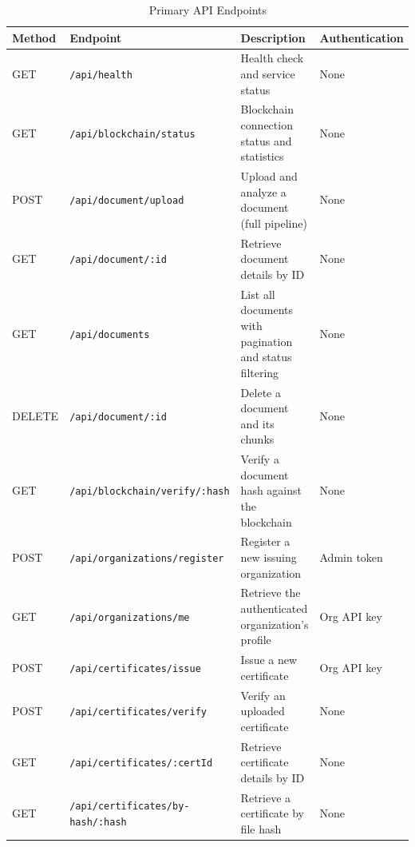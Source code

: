 \begin{table}[hbt!]
\centering
\caption{Primary API Endpoints}
\renewcommand{\arraystretch}{1.2}

\begin{tabularx}{\textwidth}{|p{1.5cm}|X|p{3.5cm}|p{2.5cm}|}
\hline
\textbf{Method} & \textbf{Endpoint} & \textbf{Description} & \textbf{Authentication} \\ 
\hline

GET & \texttt{/api/health} & Health check and service status & None \\ \hline

GET & \texttt{/api/blockchain/status} & Blockchain connection status and statistics & None \\ \hline

POST & \texttt{/api/document/upload} & Upload and analyze a document (full pipeline) & None \\ \hline

GET & \texttt{/api/document/:id} & Retrieve document details by ID & None \\ \hline

GET & \texttt{/api/documents} & List all documents with pagination and status filtering & None \\ \hline

DELETE & \texttt{/api/document/:id} & Delete a document and its chunks & None \\ \hline

GET & \texttt{/api/blockchain/verify/:hash} & Verify a document hash against the blockchain & None \\ \hline

POST & \texttt{/api/organizations/register} & Register a new issuing organization & Admin token \\ \hline

GET & \texttt{/api/organizations/me} & Retrieve the authenticated organization's profile & Org API key \\ \hline

POST & \texttt{/api/certificates/issue} & Issue a new certificate & Org API key \\ \hline

POST & \texttt{/api/certificates/verify} & Verify an uploaded certificate & None \\ \hline

GET & \texttt{/api/certificates/:certId} & Retrieve certificate details by ID & None \\ \hline

GET & \texttt{/api/certificates/by-hash/:hash} & Retrieve a certificate by file hash & None \\ \hline


\end{tabularx}
\end{table}
